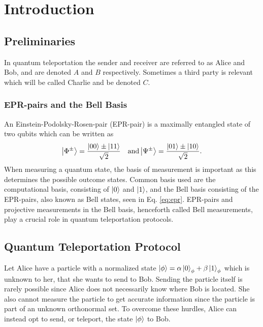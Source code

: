 \section{Introduction}
\begin{comment}
\begin{mybox}{Bullet points}
    \begin{itemize}
        \item Quantum teleportation protocol
        \item Why is it needed?
        \item Areas of application, quantum communications, quantum computers
        \item what is needed to realize it on a large scale, i.e. quantum repeaters, memory...
        \item EPR-pairs and bell basis
    \end{itemize}
\end{mybox}
\end{comment}
\subsection{Preliminaries}
In quantum teleportation the sender and receiver are referred to as Alice and Bob, and are denoted $A$ and $B$ respectively. Sometimes a third party is relevant which will be called Charlie and be denoted $C$. \cite{Nielsen:2010}

\subsubsection{EPR-pairs and the Bell Basis}
An Einstein-Podolsky-Rosen-pair (EPR-pair) is a maximally entangled state of two qubits \cite{Nielsen:2010} which can be written as
\begin{equation}
    \ket{\Phi^\pm} = \frac{\ket{00} \pm \ket{11}}{\sqrt{2}} \quad \text{and} \ket{\Psi^\pm} = \frac{\ket{01} \pm \ket{10}}{\sqrt{2}}.\label{eq:epr}
\end{equation}
When measuring a quantum state, the basis of measurement is important as this determines the possible outcome states. Common basis used are the computational basis, consisting of $\ket{0}$ and $\ket{1}$, and the Bell basis consisting of the EPR-pairs, also known as Bell states, seen in Eq. \eqref{eq:epr}. EPR-pairs and projective measurements in the Bell basis, henceforth called Bell measurements, play a crucial role in quantum teleportation protocols. \cite{Nielsen:2010}


\subsection{Quantum Teleportation Protocol}
Let Alice have a particle with a normalized state $\ket{\phi} = \alpha \ket{0}_\phi + \beta \ket{1}_\phi$ which is unknown to her, that she wants to send to Bob. Sending the particle itself is rarely possible since Alice does not necessarily know where Bob is located. She also cannot measure the particle to get accurate information since the particle is part of an unknown orthonormal set. To overcome these hurdles, Alice can instead opt to send, or teleport, the state $\ket{\phi}$ to Bob. \cite{Bennett:1993}

